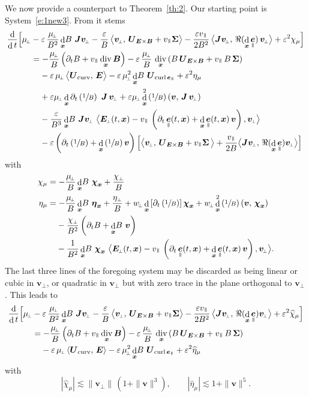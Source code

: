 \documentclass[10pt]{amsart}
\newcommand{\sperp}{{\scriptscriptstyle\perp}}
\newcommand{\blangle}{\bigl\langle}
\newcommand{\brangle}{\bigr\rangle}
\let\eps\varepsilon
\let\d\partial
\DeclareMathOperator\dD{d}\let\dd\dD
\DeclareMathOperator{\Div}{div}
\DeclareMathOperator{\Curl}{curl}
\theoremstyle{plain}
\theoremstyle{definition}
\newcommand\bB{{\boldsymbol B}}
\newcommand\bE{{\boldsymbol E}}
\newcommand\bJ{{\boldsymbol J}}
\newcommand\bU{{\boldsymbol U}}
\newcommand\bfv{{\boldsymbol v}}
\newcommand\bfx{{\boldsymbol x}}
\newcommand\bfeta{{\boldsymbol \eta}}
\newcommand\bfchi{{\boldsymbol \chi}}
\newcommand\Sig{{\boldsymbol \Sigma}}
\DeclareMathOperator{\beD}{\boldsymbol{e}}
\newcommand\eDpar{\beD_\mypar}
\newcommand\vpar{v_\mypar}
\newcommand\bvperp{\bfv_{\!\sperp}}
\newcommand\eperp{w_{\!\sperp}}
\newcommand\muperp{\mu_{\!\sperp}}
\newcommand\Eperp{\bE_{\!\sperp}}
\newcommand{\EcB}{\bU_{\bE\times\bB}}
\newcommand{\curvB}{\bU_{\mathrm{curv}}}
\newcommand{\rotB}{\bU_{\Curl\eDpar}}
\newcommand{\mypar}{{\mkern3mu\vphantom{\perp}\vrule depth 0pt\mkern2mu\vrule depth 0pt\mkern3mu}}
\begin{document}
We now provide a counterpart to Theorem~\ref{th:2}. Our starting point is System~\eqref{e:1new3}. From it stems
\begin{align*}
\frac{\dD }{\dD t}\Bigl[\muperp
&
-\eps\,\frac{\muperp}{B^2}\dD_\bfx\!B\ \bJ\bvperp
-\frac{\eps}{B}\, \blangle\bvperp,
\,\EcB+\vpar\Sig\brangle
- \frac{\eps\vpar}{2B^2}\, \blangle\bJ\bvperp,\,\Re(\dD_\bfx\eDpar)\,\bvperp\brangle
+\eps^2\chi_\mu
\Bigr]\\
&
=-\frac{\muperp}{B}\left(\d_tB+\vpar\Div_\bfx\bB\right)
-\eps\,\frac{\muperp}{B}\,\Div_\bfx\left(B\,\EcB+\vpar\,B\,\Sig\right)
\\
&\hphantom{={}}
-\eps\,\muperp\,\blangle\curvB,\,\bE\brangle
-\eps\,\muperp^2\dD_\bfx\!B\ \rotB
+\eps^2\eta_\mu\\
&\hphantom{={}}
+\eps\muperp\dD_\bfx\d_t\left(\sfrac1B\right)\ \bJ\,\bvperp
+\eps\muperp\dD_\bfx^2\left(\sfrac1B\right)\left(\bfv,\,\bJ\,\bvperp\right)\\
&\hphantom{={}}
-\frac{\eps}{B^3}\dD_\bfx\!B\ \bJ\bvperp\ \blangle \Eperp(t,\bfx) -\vpar\,\left(
\d_t\eDpar(t,\bfx)+\dD_{\bfx}\eDpar(t,\bfx)\,\bfv\right),\bvperp\brangle\\
&\hphantom{={}}
-\eps\left(\d_t\left(\sfrac1B\right)+\dD_\bfx\left(\sfrac1B\right)\bfv\right)
\Bigl[\blangle\bvperp,
\,\EcB+\vpar\Sig\,\brangle
+ \frac{\vpar}{2B} \blangle\bJ\bvperp,\,\Re(\dD_\bfx\eDpar)\bvperp\brangle\Bigr]
\end{align*}
with
\begin{align*}
\chi_\mu&
=-\frac{\muperp}{B}\dD_\bfx\!B\ \bfchi_\bfx
+\frac{\chi_\sperp}{B}\\
\eta_\mu&
=-\frac{\muperp}{B}\dD_\bfx\!B\ \bfeta_\bfx+\frac{\eta_\sperp}{B}
+\eperp\dD_\bfx\left[\d_t\left(\sfrac1B\right)\right]\bfchi_\bfx
+\eperp\dD_\bfx^2\left(\sfrac1B\right)\left(\bfv,\,\bfchi_\bfx\right) \\
&\hphantom{={}}
-\frac{\chi_\sperp}{B^2}\left(\d_tB+\dD_\bfx\!B\ \bfv\right)\\
&\hphantom{={}}
-\frac{1}{B^2}\dD_\bfx\!B\ \bfchi_\bfx\ \blangle \Eperp(t,\bfx) -\vpar\,\left(
\d_t\eDpar(t,\bfx)+\dD_{\bfx}\eDpar(t,\bfx)\,\bfv\right),\bvperp\brangle.
\end{align*}
The last three lines of the foregoing system may be discarded as being linear or cubic in $\bvperp$, or quadratic in $\bvperp$ but with zero trace in the plane orthogonal to $\bvperp$. This leads to
\begin{align*}
\frac{\dD }{\dD t}\Bigl[\muperp
&
-\eps\,\frac{\muperp}{B^2}\dD_\bfx\!B\ \bJ\bvperp
-\frac{\eps}{B}\, \blangle\bvperp,
\,\EcB+\vpar\Sig\brangle
- \frac{\eps\vpar}{2B^2}\, \blangle\bJ\bvperp,\,\Re(\dD_\bfx\eDpar)\bvperp\brangle
+\eps^2\widehat\chi_\mu
\Bigr]\\
&
=-\frac{\muperp}{B}\left(\d_tB+\vpar\Div_\bfx\bB\right)
-\eps\,\frac{\muperp}{B}\,\Div_\bfx\left(B\,\EcB+\vpar\,B\,\Sig\right)
\\
&\hphantom{={}}
-\eps\,\muperp\,\langle\curvB,\,\bE\rangle
-\eps\,\muperp^2\dD_\bfx\!B\ \rotB
+\eps^2\widehat\eta_\mu
\end{align*}
with
\[
|\widehat\chi_\mu|\lesssim \|\bvperp\|\,(1+\|\bfv\|^3),\qquad
|\widehat\eta_\mu|\lesssim 1+\|\bfv\|^5.
\]
\end{document}
